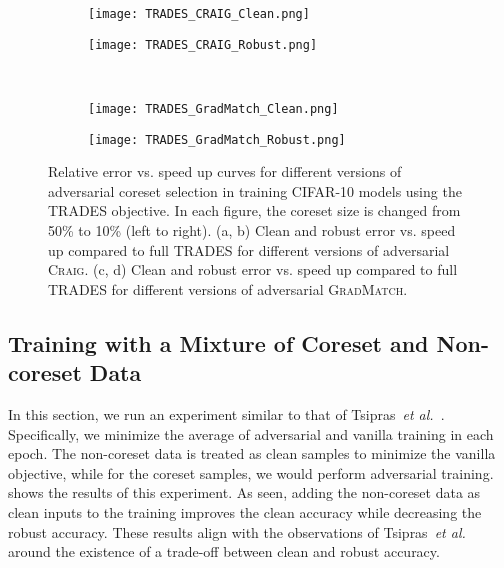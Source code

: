 \documentclass[runningheads]{llncs}
\newcommand{\etal}{\textit{et al.}}
\begin{document}
\begin{figure*}[p!]
	\centering
	\begin{subfigure}{.49\textwidth}
		\centering
		\texttt{[image: TRADES\_CRAIG\_Clean.png]}
		\caption{}
		\label{fig:tradeoff:craig_clean}
	\end{subfigure}
	\begin{subfigure}{.49\textwidth}
		\centering
		\texttt{[image: TRADES\_CRAIG\_Robust.png]}
		\caption{}
		\label{fig:tradeoff:craig_robust}
	\end{subfigure}\\
	\begin{subfigure}{.49\textwidth}
		\centering
		\texttt{[image: TRADES\_GradMatch\_Clean.png]}
		\caption{}
		\label{fig:tradeoff:gradmatch_clean}
	\end{subfigure}
	\begin{subfigure}{.49\textwidth}
		\centering
		\texttt{[image: TRADES\_GradMatch\_Robust.png]}
		\caption{}
		\label{fig:tradeoff:gradmatch_robust}
	\end{subfigure}
	\caption{Relative error vs. speed up curves for different versions of adversarial coreset selection in training CIFAR-10 models using the TRADES objective. In each figure, the coreset size is changed from 50\% to 10\% (left to right). (a, b) Clean and robust error vs. speed up compared to full TRADES for different versions of adversarial \textsc{Craig}. (c, d) Clean and robust error vs. speed up compared to full TRADES for different versions of adversarial \textsc{GradMatch}.}
	\label{fig:tradeoff}
\end{figure*}

\subsection{Training with a Mixture of Coreset and Non-coreset Data}
In this section, we run an experiment similar to that of Tsipras~\etal~\cite{tsipras2019robustness}.
Specifically, we minimize the average of adversarial and vanilla training in each epoch.
The non-coreset data is treated as clean samples to minimize the vanilla objective, while for the coreset samples, we would perform adversarial training.
 shows the results of this experiment.
As seen, adding the non-coreset data as clean inputs to the training improves the clean accuracy while decreasing the robust accuracy.
These results align with the observations of Tsipras~\etal~\cite{tsipras2019robustness} around the existence of a trade-off between clean and robust accuracy.
\end{document}
